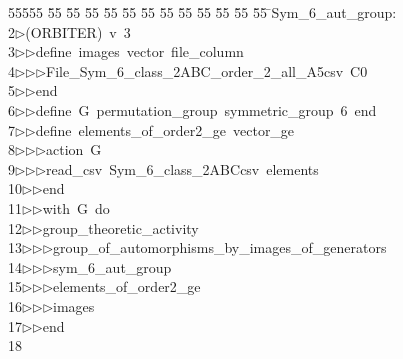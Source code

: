 %
%
\begin{tabbing}
55555 \= 55 \= 55 \= 55 \= 55 \= 55 \= 55 \= 55 \= 55 \= 55 \= 55 \= 55 \= 55 \= \>Sym\_6\_aut\_group:\\[0pt]
2\>$\triangleright$\>(ORBITER)\ v\ 3\ \\[0pt]
3\>$\triangleright$\>$\triangleright$\>define\ images\ vector\ file\_column\ \\[0pt]
4\>$\triangleright$\>$\triangleright$\>$\triangleright$\>File\_Sym\_6\_class\_2ABC\_order\_2\_all\_A5csv\ C0\ \\[0pt]
5\>$\triangleright$\>$\triangleright$\>end\ \\[0pt]
6\>$\triangleright$\>$\triangleright$\>define\ G\ permutation\_group\ symmetric\_group\ 6\ end\ \\[0pt]
7\>$\triangleright$\>$\triangleright$\>define\ elements\_of\_order2\_ge\ vector\_ge\ \\[0pt]
8\>$\triangleright$\>$\triangleright$\>$\triangleright$\>action\ G\ \\[0pt]
9\>$\triangleright$\>$\triangleright$\>$\triangleright$\>read\_csv\ Sym\_6\_class\_2ABCcsv\ elements\ \\[0pt]
10\>$\triangleright$\>$\triangleright$\>end\ \\[0pt]
11\>$\triangleright$\>$\triangleright$\>with\ G\ do\ \\[0pt]
12\>$\triangleright$\>$\triangleright$\>group\_theoretic\_activity\ \\[0pt]
13\>$\triangleright$\>$\triangleright$\>$\triangleright$\>group\_of\_automorphisms\_by\_images\_of\_generators\ \\[0pt]
14\>$\triangleright$\>$\triangleright$\>$\triangleright$\>sym\_6\_aut\_group\ \\[0pt]
15\>$\triangleright$\>$\triangleright$\>$\triangleright$\>elements\_of\_order2\_ge\ \\[0pt]
16\>$\triangleright$\>$\triangleright$\>$\triangleright$\>images\ \\[0pt]
17\>$\triangleright$\>$\triangleright$\>end\\[0pt]
18\>\end{tabbing}
